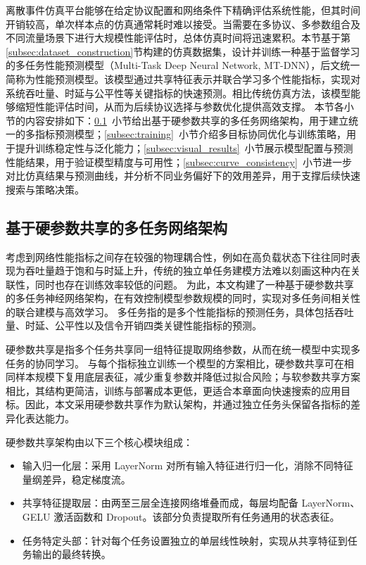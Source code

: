 离散事件仿真平台能够在给定协议配置和网络条件下精确评估系统性能，但其时间开销较高，单次样本点的仿真通常耗时难以接受。当需要在多协议、多参数组合及不同流量场景下进行大规模性能评估时，总体仿真时间将迅速累积。本节基于第\ref{subsec:dataset_construction}节构建的仿真数据集，设计并训练一种基于监督学习的多任务性能预测模型（Multi-Task Deep Neural Network, MT-DNN），后文统一简称为性能预测模型。该模型通过共享特征表示并联合学习多个性能指标，实现对系统吞吐量、时延与公平性等关键指标的快速预测。相比传统仿真方法，该模型能够缩短性能评估时间，从而为后续协议选择与参数优化提供高效支撑。
本节各小节的内容安排如下：\ref{subsec:hard_sharing}~小节给出基于硬参数共享的多任务网络架构，用于建立统一的多指标预测模型；\ref{subsec:training}~小节介绍多目标协同优化与训练策略，用于提升训练稳定性与泛化能力；\ref{subsec:visual_results}~小节展示模型配置与预测性能结果，用于验证模型精度与可用性；\ref{subsec:curve_consistency}~小节进一步对比仿真结果与预测曲线，并分析不同业务偏好下的效用差异，用于支撑后续快速搜索与策略决策。


\subsection{基于硬参数共享的多任务网络架构}
\label{subsec:hard_sharing}

考虑到网络性能指标之间存在较强的物理耦合性，例如在高负载状态下往往同时表现为吞吐量趋于饱和与时延上升，传统的独立单任务建模方法难以刻画这种内在关联性，同时也存在训练效率较低的问题。
为此，本文构建了一种基于硬参数共享的多任务神经网络架构，在有效控制模型参数规模的同时，实现对多任务间相关性的联合建模与高效学习。
多任务指的是多个性能指标的预测任务，具体包括吞吐量、时延、公平性以及信令开销四类关键性能指标的预测。

硬参数共享是指多个任务共享同一组特征提取网络参数，从而在统一模型中实现多任务的协同学习。
与每个指标独立训练一个模型的方案相比，硬参数共享可在相同样本规模下复用底层表征，减少重复参数并降低过拟合风险；与软参数共享方案相比，其结构更简洁，训练与部署成本更低，更适合本章面向快速搜索的应用目标。因此，本文采用硬参数共享作为默认架构，并通过独立任务头保留各指标的差异化表达能力。

硬参数共享架构由以下三个核心模块组成：
\begin{itemize}[leftmargin=*]
	\item 输入归一化层：采用 LayerNorm 对所有输入特征进行归一化，消除不同特征量纲差异，稳定梯度流。
	\item 共享特征提取层：由两至三层全连接网络堆叠而成，每层均配备 LayerNorm、GELU 激活函数和 Dropout。该部分负责提取所有任务通用的状态表征。
	\item 任务特定头部：针对每个任务设置独立的单层线性映射，实现从共享特征到任务输出的最终转换。
\end{itemize}



